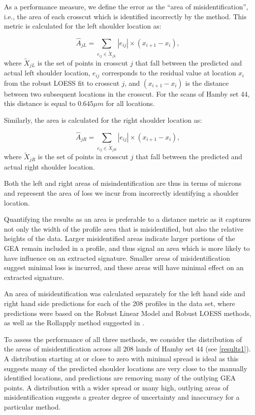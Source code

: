 \documentclass[12pt]{article}
\begin{document}
As a performance measure, we define the error as the ``area of
misidentification'', i.e., the area of each crosscut which is identified
incorrectly by the method. This metric is calculated for the left
shoulder location as:

\[ \widehat{A}_{jL} = \sum_{e_{ij} \in \widetilde{X}_{jL}} \left|e_{ij} \right| \times \left(x_{i+1} - x_i \right),\]
where \(\widetilde{X}_{jL}\) is the set of points in crosscut \(j\) that
fall between the predicted and actual left shoulder location, \(e_{ij}\)
corresponds to the residual value at location \(x_i\) from the robust
LOESS fit to crosscut \(j\), and \((x_{i+1} - x_i)\) is the distance
between two subsequent locations in the crosscut. For the scans of Hamby
set 44, this distance is equal to \(0.645 \mu m\) for all locations.

Similarly, the area is calculated for the right shoulder location as:

\[ \widehat{A}_{jR} = \sum_{e_{ij} \in \widetilde{X}_{jR}} \left|e_{ij} \right| \times \left(x_{i+1} - x_i \right),\]
where \(\widetilde{X}_{jR}\) is the set of points in crosscut \(j\) that
fall between the predicted and actual right shoulder location.

Both the left and right areas of misindentification are thus in terms of
microns and represent the area of loss we incur from incorrectly
identifying a shoulder location.

Quantifying the results as an area is preferable to a distance metric as
it captures not only the width of the profile area that is
misidentified, but also the relative heights of the data. Larger
misidentified areas indicate larger portions of the GEA remain included
in a profile, and thus signal an area which is more likely to have
influence on an extracted signature. Smaller areas of misidentification
suggest minimal loss is incurred, and these areas will have minimal
effect on an extracted signature.

An area of misidentification was calculated separately for the left hand
side and right hand side predictions for each of the 208 profiles in the
data set, where predictions were based on the Robust Linear Model and
Robust LOESS methods, as well as the Rollapply method suggested in
\citet{Hare1}.

To assess the performance of all three methods, we consider the
distribution of the areas of misidentification across all 208 lands of
Hamby set 44 (see \autoref{results1}). A distribution starting at or
close to zero with minimal spread is ideal as this suggests many of the
predicted shoulder locations are very close to the manually identified
locations, and predictions are removing many of the outlying GEA points.
A distribution with a wider spread or many high, outlying areas of
misidentification suggests a greater degree of uncertainty and
inaccuracy for a particular method.
\end{document}
